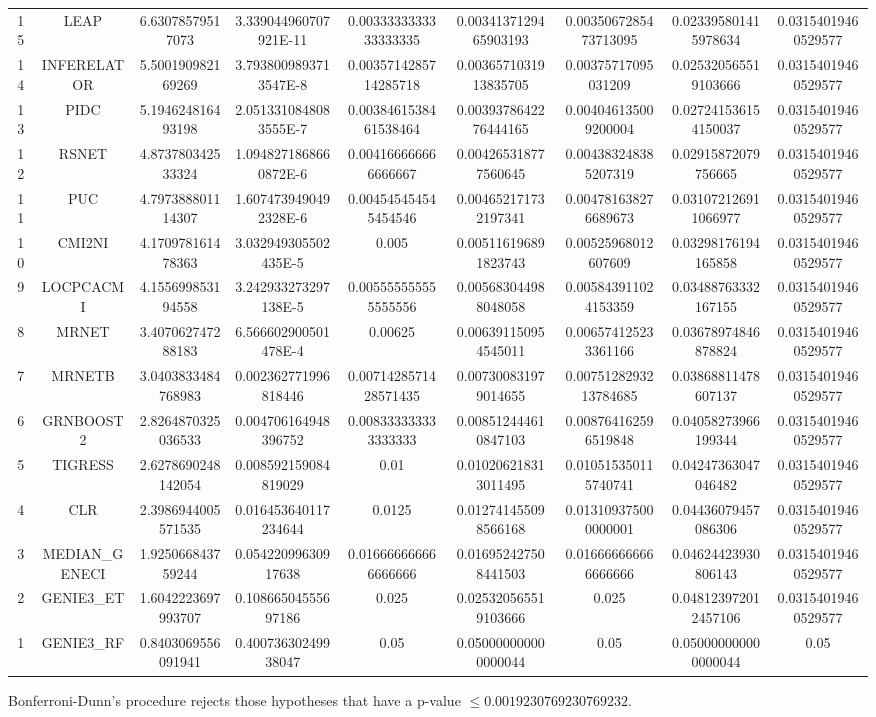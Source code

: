 \documentclass[a4paper,10pt]{article}
\begin{document}
\begin{landscape}
\begin{table}[!htp]
\begin{tabular}{ccccccccc}
15&LEAP&6.63078579517073&3.339044960707921E-11&0.0033333333333333335&0.0034137129465903193&0.0035067285473713095&0.023395801415978634&0.03154019460529577\\
14&INFERELATOR&5.500190982169269&3.7938009893713547E-8&0.0035714285714285718&0.0036571031913835705&0.00375717095031209&0.025320565519103666&0.03154019460529577\\
13&PIDC&5.194624816493198&2.0513310848083555E-7&0.0038461538461538464&0.0039378642276444165&0.004046135009200004&0.027241536154150037&0.03154019460529577\\
12&RSNET&4.873780342533324&1.0948271868660872E-6&0.004166666666666667&0.004265318777560645&0.004383248385207319&0.02915872079756665&0.03154019460529577\\
11&PUC&4.797388801114307&1.6074739490492328E-6&0.004545454545454546&0.004652171732197341&0.004781638276689673&0.031072126911066977&0.03154019460529577\\
10&CMI2NI&4.170978161478363&3.032949305502435E-5&0.005&0.005116196891823743&0.00525968012607609&0.03298176194165858&0.03154019460529577\\
9&LOCPCACMI&4.155699853194558&3.242933273297138E-5&0.005555555555555556&0.005683044988048058&0.005843911024153359&0.03488763332167155&0.03154019460529577\\
8&MRNET&3.407062747288183&6.566602900501478E-4&0.00625&0.006391150954545011&0.006574125233361166&0.03678974846878824&0.03154019460529577\\
7&MRNETB&3.0403833484768983&0.002362771996818446&0.0071428571428571435&0.007300831979014655&0.0075128293213784685&0.03868811478607137&0.03154019460529577\\
6&GRNBOOST2&2.8264870325036533&0.004706164948396752&0.008333333333333333&0.008512444610847103&0.008764162596519848&0.04058273966199344&0.03154019460529577\\
5&TIGRESS&2.6278690248142054&0.008592159084819029&0.01&0.010206218313011495&0.010515350115740741&0.04247363047046482&0.03154019460529577\\
4&CLR&2.3986944005571535&0.016453640117234644&0.0125&0.012741455098566168&0.013109375000000001&0.04436079457086306&0.03154019460529577\\
3&MEDIAN_GENECI&1.925066843759244&0.05422099630917638&0.016666666666666666&0.016952427508441503&0.016666666666666666&0.04624423930806143&0.03154019460529577\\
2&GENIE3_ET&1.6042223697993707&0.10866504555697186&0.025&0.025320565519103666&0.025&0.048123972012457106&0.03154019460529577\\
1&GENIE3_RF&0.8403069556091941&0.40073630249938047&0.05&0.050000000000000044&0.05&0.050000000000000044&0.05\\
\hline
\end{tabular}
\end{table}
Bonferroni-Dunn's procedure rejects those hypotheses that have a p-value $\le0.0019230769230769232$.



\end{landscape}
\end{document}
